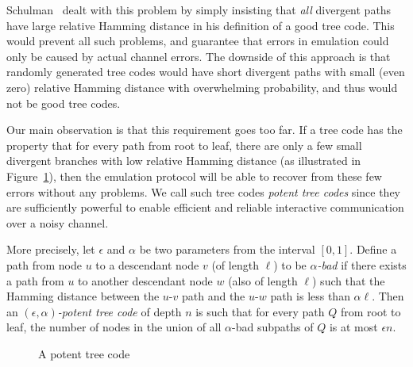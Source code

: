 \documentclass[ letterpaper, 11pt]{article}
\newcommand{\potent}{potent\xspace}
\begin{document}
Schulman~\cite{schulman93} dealt with this problem by simply insisting that \emph{all} divergent paths have large relative Hamming distance in his definition of a good tree code.  This would prevent all such problems, and guarantee that errors in emulation could only be caused by actual channel errors.  The downside of this approach is that randomly generated tree codes would have short divergent paths with small (even zero) relative Hamming distance with overwhelming probability, and thus would not be good tree codes.

Our main observation is that this requirement goes too far.  If a tree code has the property that for every path from root to leaf, there are only a few small divergent branches with low relative Hamming distance (as illustrated in Figure~\ref{fig:potent}), then the emulation protocol will be able to recover from these few errors without any problems.  We call such tree codes \emph{\potent tree codes} since they are sufficiently powerful to enable efficient and reliable interactive communication over a noisy channel.

More precisely, let $\epsilon$ and $\alpha$ be two parameters from the interval $[0,1]$.
Define a path from node $u$ to a descendant node $v$ (of length
$\ell$) to be \emph{$\alpha$-bad} if there exists a path from $u$ to
another descendant node $w$ (also of length $\ell$) such that the
Hamming distance between the $u$-$v$ path and the $u$-$w$ path is less
than $\alpha \ell$.
Then an \emph{$(\epsilon,\alpha)$-potent tree code} of depth $n$ is such that for every path $Q$ from root to leaf, the number of nodes in the union of all $\alpha$-bad subpaths of $Q$ is at most
$\epsilon n$.



\begin{figure}[htb]
\begin{center}
\end{center}
\caption{A potent tree code}
\label{fig:potent}
\end{figure}
\end{document}
